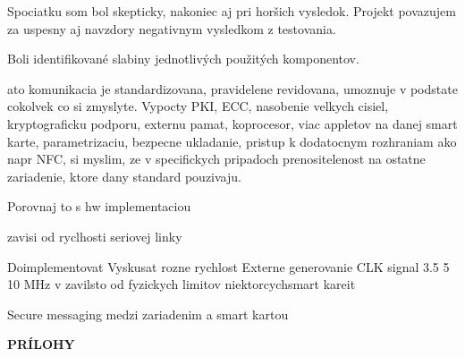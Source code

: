 \documentclass[12pt,a4wide,oneside,openright]{report}
\begin{document}
Spociatku som bol skepticky, nakoniec aj pri horšich vysledok. Projekt povazujem za uspesny aj navzdory negativnym vysledkom z testovania.

Boli identifikované slabiny jednotlivých použitých komponentov.

ato komunikacia je standardizovana, pravidelene revidovana, umoznuje v podstate cokolvek co si zmyslyte. Vypocty PKI, ECC, nasobenie velkych cisiel, kryptograficku podporu, externu pamat, koprocesor, viac appletov na danej smart karte, parametrizaciu, bezpecne ukladanie, pristup k dodatocnym rozhraniam ako napr NFC, si myslim, ze v specifickych pripadoch prenositelenost na ostatne zariadenie, ktore dany standard pouzivaju.



Porovnaj to s hw implementaciou

zavisi od ryclhosti seriovej linky

Doimplementovat 
Vyskusat rozne rychlost
Externe generovanie CLK signal 3.5 5 10 MHz v zavilsto od fyzickych limitov niektorcychsmart kareit

Secure messaging medzi zariadenim a smart kartou




\clearpage
{}
{}



\newpage
\thispagestyle{empty}
\vspace*{10cm}
\hspace*{5cm}
\textbf{\LARGE{PRÍLOHY}}

\addappheadtotoc
\def\appendixname{}
\appendix

\newpage
{}
\end{document}
